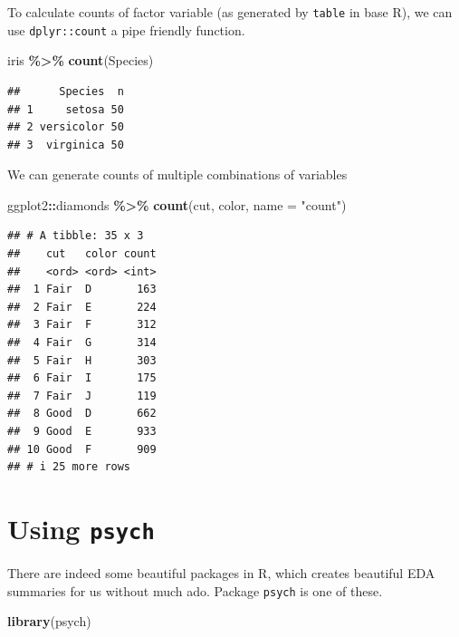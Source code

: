 \documentclass[
]{book}
\newenvironment{Shaded}{\begin{snugshade}}{\end{snugshade}}
\newcommand{\AttributeTok}[1]{\textcolor[rgb]{0.13,0.29,0.53}{#1}}
\newcommand{\FunctionTok}[1]{\textcolor[rgb]{0.13,0.29,0.53}{\textbf{#1}}}
\newcommand{\NormalTok}[1]{#1}
\newcommand{\SpecialCharTok}[1]{\textcolor[rgb]{0.81,0.36,0.00}{\textbf{#1}}}
\newcommand{\StringTok}[1]{\textcolor[rgb]{0.31,0.60,0.02}{#1}}
\begin{document}
To calculate counts of factor variable (as generated by \texttt{table} in base R), we can use \texttt{dplyr::count} a pipe friendly function.

\begin{Shaded}
\begin{Highlighting}[]
\NormalTok{iris }\SpecialCharTok{\%\textgreater{}\%} 
  \FunctionTok{count}\NormalTok{(Species)}
\end{Highlighting}
\end{Shaded}

\begin{verbatim}
##      Species  n
## 1     setosa 50
## 2 versicolor 50
## 3  virginica 50
\end{verbatim}

We can generate counts of multiple combinations of variables

\begin{Shaded}
\begin{Highlighting}[]
\NormalTok{ggplot2}\SpecialCharTok{::}\NormalTok{diamonds }\SpecialCharTok{\%\textgreater{}\%} 
  \FunctionTok{count}\NormalTok{(cut, color, }\AttributeTok{name =} \StringTok{"count"}\NormalTok{)}
\end{Highlighting}
\end{Shaded}

\begin{verbatim}
## # A tibble: 35 x 3
##    cut   color count
##    <ord> <ord> <int>
##  1 Fair  D       163
##  2 Fair  E       224
##  3 Fair  F       312
##  4 Fair  G       314
##  5 Fair  H       303
##  6 Fair  I       175
##  7 Fair  J       119
##  8 Good  D       662
##  9 Good  E       933
## 10 Good  F       909
## # i 25 more rows
\end{verbatim}

\hypertarget{using-psych}{%
\section{\texorpdfstring{Using \texttt{psych}}{Using psych}}\label{using-psych}}

There are indeed some beautiful packages in R, which creates beautiful EDA summaries for us without much ado. Package \texttt{psych} is one of these.

\begin{Shaded}
\begin{Highlighting}[]
\FunctionTok{library}\NormalTok{(psych)}
\end{Highlighting}
\end{Shaded}
\end{document}
